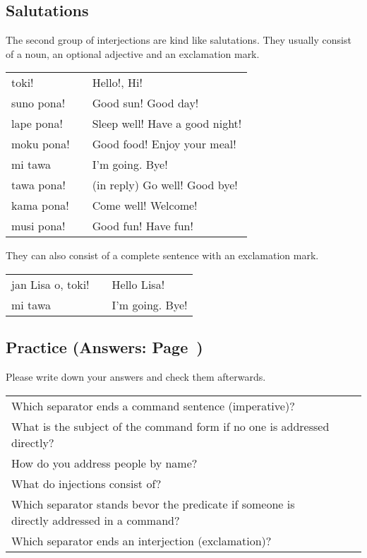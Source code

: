 {%
%
\subsection*{Salutations}
%
%
The second group of interjections are kind like salutations.
They usually consist of a noun, an optional adjective and an exclamation mark. 

\begin{supertabular}{p{5,5cm}|ll}
toki! && Hello!, Hi! \\
suno pona! && Good sun! Good day! \\
lape pona! && Sleep well! Have a good night! \\
moku pona! && Good food! Enjoy your meal! \\
mi tawa && I'm going. Bye! \\
tawa pona! && (in reply) Go well! Good bye! \\
kama pona! && Come well! Welcome! \\
musi pona! && Good fun! Have fun! \\
\end{supertabular}  

They can also consist of a complete sentence with an exclamation mark.

\begin{supertabular}{p{5,5cm}|ll}
jan Lisa o, toki! && Hello Lisa! \\
mi tawa && I'm going. Bye! \\
\end{supertabular}
%
\newpage{}
%
\subsection*{Practice (Answers: Page~\pageref{'commands_interjections'})}
%
Please write down your answers and check them afterwards. 

\begin{supertabular}{p{5,5cm}|ll}
Which separator ends a command sentence (imperative)? &&  \\ %
What is the subject of the command form if no one is addressed directly? &&  \\ %
How do you address people by name? &&  \\ %
What do injections consist of? &&  \\ %
Which separator stands bevor  the predicate if someone is directly addressed in a command? &&  \\ %
Which separator ends an interjection (exclamation)? &&  \\ %
\end{supertabular}

}
